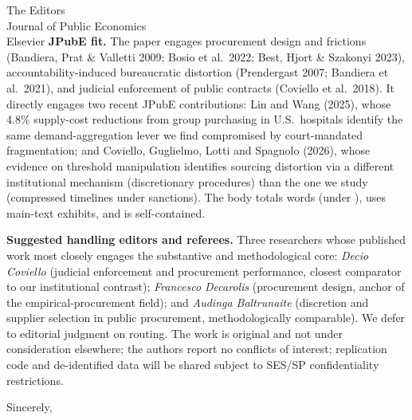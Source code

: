 \documentclass[11pt,a4paper]{letter}
\begin{document}
\begin{letter}{The Editors \\ Journal of Public Economics \\ Elsevier}
\smallskip\noindent\textbf{JPubE fit.}
The paper engages procurement design and frictions (Bandiera, Prat \& Valletti 2009; Bosio et al.\ 2022; Best, Hjort \& Szakonyi 2023), accountability-induced bureaucratic distortion (Prendergast 2007; Bandiera et al.\ 2021), and judicial enforcement of public contracts (Coviello et al.\ 2018). It directly engages two recent JPubE contributions: Lin and Wang (2025), whose 4.8\% supply-cost reductions from group purchasing in U.S.\ hospitals identify the same demand-aggregation lever we find compromised by court-mandated fragmentation; and Coviello, Guglielmo, Lotti and Spagnolo (2026), whose evidence on threshold manipulation identifies sourcing distortion via a different institutional mechanism (discretionary procedures) than the one we study (compressed timelines under sanctions). The body totals \BPbodyWordCount{} words (under \BPbodyWordCap), uses \BPexhibitsTotal{} main-text exhibits, and is self-contained.

\smallskip\noindent\textbf{Suggested handling editors and referees.}
Three researchers whose published work most closely engages the substantive and methodological core: \emph{Decio Coviello} (judicial enforcement and procurement performance, closest comparator to our institutional contrast); \emph{Francesco Decarolis} (procurement design, anchor of the empirical-procurement field); and \emph{Audinga Baltrunaite} (discretion and supplier selection in public procurement, methodologically comparable). We defer to editorial judgment on routing. The work is original and not under consideration elsewhere; the authors report no conflicts of interest; replication code and de-identified data will be shared subject to SES/SP confidentiality restrictions.

\closing{Sincerely,}

\end{letter}
\end{document}
